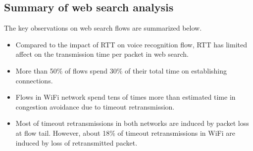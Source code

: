\subsection{Summary of web search analysis}

The key observations on web search flows are summarized below.

\begin{itemize}
	\item Compared to the impact of RTT on voice recognition flow, RTT has limited affect on the transmission time per packet in web search.
	\item More than 50\% of flows spend 30\% of their total time on establishing connections.
	\item Flows in WiFi network spend tens of times more than estimated time in congestion avoidance due to timeout retransmission.
	\item Most of timeout retransmissions in both networks are induced by packet loss at flow tail. However, about 18\% of timeout retransmissions in WiFi are induced by loss of retransmitted packet.
\end{itemize}
